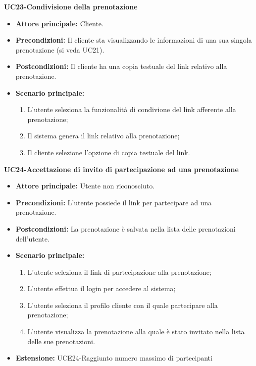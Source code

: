 \textbf{UC23-Condivisione della prenotazione}
\begin{itemize}
    \item \textbf{Attore principale: } Cliente.
    \item \textbf{Precondizioni: }Il cliente sta visualizzando le informazioni di una sua singola prenotazione (si veda UC21).
    \item \textbf{Postcondizioni: }Il cliente ha una copia testuale del link relativo alla prenotazione.
    \item \textbf{Scenario principale:} 
        \begin{enumerate}
            \item L'utente seleziona la funzionalità di condivione del link afferente alla prenotazione;
            \item Il sistema genera il link relativo alla prenotazione;
            \item Il cliente selezione l'opzione di copia testuale del link.
        \end{enumerate}
\end{itemize}

\textbf{UC24-Accettazione di invito di partecipazione ad una prenotazione}
\begin{itemize}
    \item \textbf{Attore principale: } Utente non riconosciuto.
    \item \textbf{Precondizioni: }L'utente possiede il link per partecipare ad una prenotazione.
    \item \textbf{Postcondizioni: }La prenotazione è salvata nella lista delle prenotazioni dell'utente.
    \item \textbf{Scenario principale:} 
        \begin{enumerate}
            \item L'utente seleziona il link di partecipazione alla prenotazione;
            \item L'utente effettua il login per accedere al sistema;
            \item L'utente seleziona il profilo cliente con il quale partecipare alla prenotazione;
            \item L'utente visualizza la prenotazione alla quale è stato invitato nella lista delle sue
            prenotazioni.
        \end{enumerate}
        \item \textbf{Estensione: }UCE24-Raggiunto numero massimo di partecipanti
    \end{itemize}

